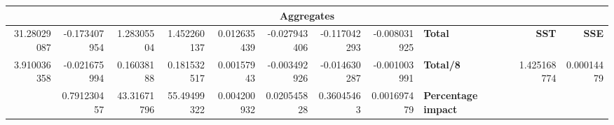 \documentclass[11pt,a4paper]{article}
\begin{document}
{\begin{landscape}
{\begin{tabular}{|*{15}{r|}}
                \hline\multicolumn{15}{|c|}{\textbf{Aggregates}} \\
                \hline 31.28029087 & -0.173407954 & 1.28305504 & 1.452260137 & 0.012635439 & -0.027943406 & -0.117042293 & -0.008031925 & \multicolumn{3}{|l|}{\textbf{Total}} & \multicolumn{2}{|r|}{} & \textbf{SST} & \textbf{SSE} \\
                \hline 3.910036358 & -0.021675994 & 0.16038188 & 0.181532517 & 0.00157943 & -0.003492926 & -0.014630287 & -0.001003991 & \multicolumn{3}{|l|}{\textbf{Total/8}} & \multicolumn{2}{|r|}{} & 1.425168774 & 0.00014479 \\
                \hline & 0.791230457 & 43.31671796 & 55.49499322 & 0.004200932 & 0.020545828 & 0.36045463 & 0.001697479 & \multicolumn{3}{|l|}{\textbf{Percentage impact}} & \multicolumn{4}{|l|}{} \\
                \hline
            \end{tabular}
        }
        \label{table::rw_2k_through}

        \vspace{2cm}


\end{landscape}}
\end{document}
